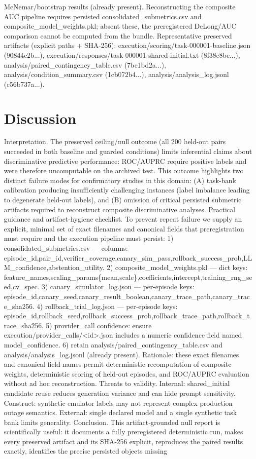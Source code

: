 \documentclass[conference]{IEEEtran}
\begin{document}
McNemar/bootstrap results (already present). Reconstructing the composite AUC pipeline requires persisted consolidated\_submetrics.csv and composite\_model\_weights.pkl; absent these, the preregistered DeLong/AUC comparison cannot be computed from the bundle. Representative preserved artifacts (explicit paths + SHA‑256): execution/scoring/task-000001-baseline.json (90844c2b...), execution/responses/task-000001-shared-initial.txt (8f38c8be...), analysis/paired\_contingency\_table.csv (7bc1bd2a...), analysis/condition\_summary.csv (1cb072b4...), analysis/analysis\_log.jsonl (c56b737a...).

\section{Discussion}
Interpretation. The preserved ceiling/null outcome (all 200 held‑out pairs succeeded in both baseline and guarded conditions) limits inferential claims about discriminative predictive performance: ROC/AUPRC require positive labels and were therefore uncomputable on the archived test. This outcome highlights two distinct failure modes for confirmatory studies in this domain: (A) task-bank calibration producing insufficiently challenging instances (label imbalance leading to degenerate held‑out labels), and (B) omission of critical persisted submetric artifacts required to reconstruct composite discriminative analyses. Practical guidance and artifact‑hygiene checklist. To prevent repeat failure we supply an explicit, minimal set of exact filenames and canonical fields that preregistration must require and the execution pipeline must persist: 1) consolidated\_submetrics.csv --- columns: episode\_id,pair\_id,verifier\_coverage,canary\_sim\_pass,rollback\_success\_prob,LLM\_confidence,abstention\_utility. 2) composite\_model\_weights.pkl --- dict keys: feature\_names,scaling\_params\{mean,scale\},coefficients,intercept,training\_rng\_seed,cv\_spec. 3) canary\_simulator\_log.json --- per‑episode keys: episode\_id,canary\_seed,canary\_result\_boolean,canary\_trace\_path,canary\_trace\_sha256. 4) rollback\_trial\_log.json --- per‑episode keys: episode\_id,rollback\_seed,rollback\_success\_prob,rollback\_trace\_path,rollback\_trace\_sha256. 5) provider\_call confidence: ensure execution/provider\_calls/<id>.json includes a numeric confidence field named model\_confidence. 6) retain analysis/paired\_contingency\_table.csv and analysis/analysis\_log.jsonl (already present). Rationale: these exact filenames and canonical field names permit deterministic recomputation of composite weights, deterministic scoring of held‑out episodes, and ROC/AUPRC evaluation without ad hoc reconstruction. Threats to validity. Internal: shared\_initial candidate reuse reduces generation variance and can hide prompt sensitivity. Construct: synthetic emulator labels may not represent complex production outage semantics. External: single declared model and a single synthetic task bank limits generality. Conclusion. This artifact‑grounded null report is scientifically useful: it documents a fully preregistered deterministic run, makes every preserved artifact and its SHA‑256 explicit, reproduces the paired results exactly, identifies the precise persisted objects missing 
\end{document}
